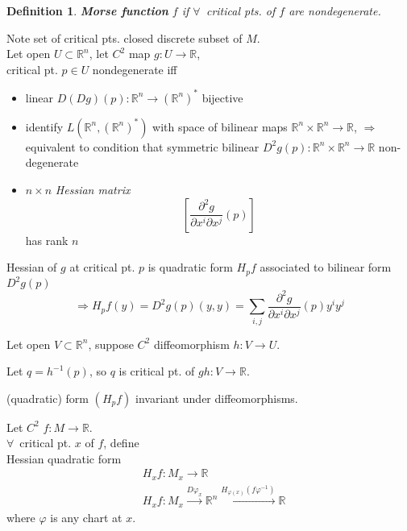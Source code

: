 \documentclass[10pt]{amsart}
\newtheorem{definition}{Definition}
\begin{document}
\begin{multicols*}{2}
\begin{definition}
  \textbf{Morse function} $f$ if $\forall \, $ critical pts. of $f$ are nondegenerate.
  \end{definition}

Note set of critical pts. closed discrete subset of $M$.  \\
Let open $U \subset \mathbb{R}^n$, let $C^2$ map $g:U\to \mathbb{R}$, \\
critical pt. $p\in U$ nondegenerate iff
\begin{itemize}
\item linear $D(Dg)(p):\mathbb{R}^n \to (\mathbb{R}^n)^*$ bijective
\item identify $L(\mathbb{R}^n, (\mathbb{R}^n)^*)$ with space of bilinear maps $\mathbb{R}^n \times \mathbb{R}^n \to \mathbb{R}$, $\Longrightarrow$ equivalent to condition that symmetric bilinear $D^2g(p) : \mathbb{R}^n \times \mathbb{R}^n \to \mathbb{R}$ non-degenerate 
\item $n\times n$ \emph{Hessian matrix}
  \[
\left[ \frac{ \partial^2 g}{ \partial x^i  \partial x^j }(p) \right]
\]
has rank $n$
\end{itemize}

Hessian of $g$ at critical pt. $p$ is quadratic form $H_pf$ associated to bilinear form $D^2g(p)$
\[
\Longrightarrow H_pf(y) =D^2g(p)(y,y) = \sum_{i,j} \frac{ \partial^2g}{ \partial x^i \partial x^j}(p)y^i y^j
\]

Let open $V \subset \mathbb{R}^n$, suppose $C^2$ diffeomorphism $h: V\to U$.

Let $q=h^{-1}(p)$, so $q$ is critical pt. of $gh:V\to \mathbb{R}$.


(quadratic) form $(H_pf)$ invariant under diffeomorphisms.


Let $C^2$ $f:M\to \mathbb{R}$.  \\
$\forall \,$ critical pt. $x$ of $f$, define \\
Hessian quadratic form
\[
\begin{aligned}
  & H_xf : M_x \to \mathbb{R} \\ 
  & H_xf : M_x \xrightarrow{ D\varphi_x } \mathbb{R}^n \xrightarrow{ H_{\varphi(x)}(f\varphi^{-1} ) } \mathbb{R}
\end{aligned}
\]
where $\varphi$ is any chart at $x$.


\end{multicols*}
\end{document}
